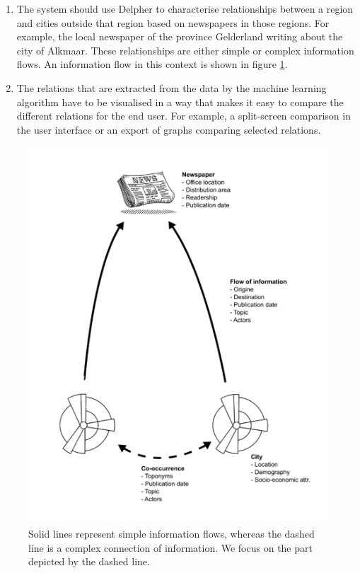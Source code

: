 \begin{enumerate}
    \item The system should use Delpher to characterise relationships between a region and cities outside that region based on newspapers in those regions. For example, the local newspaper of the province Gelderland writing about the city of Alkmaar. These relationships are either simple or complex information flows. An information flow in this context is shown in figure \ref{fig:infoflow}.
    \item The relations that are extracted from the data by the machine learning algorithm have to be visualised in a way that makes it easy to compare the different relations for the end user. For example, a split-screen comparison in the user interface or an export of graphs comparing selected relations.
\end{enumerate}
\begin{figure}
    \centering
    \includegraphics{informationflow}
    \caption{Solid lines represent simple information flows, whereas the dashed line is a complex connection of information. We focus on the part depicted by the dashed line.}
    \label{fig:infoflow}
\end{figure}
